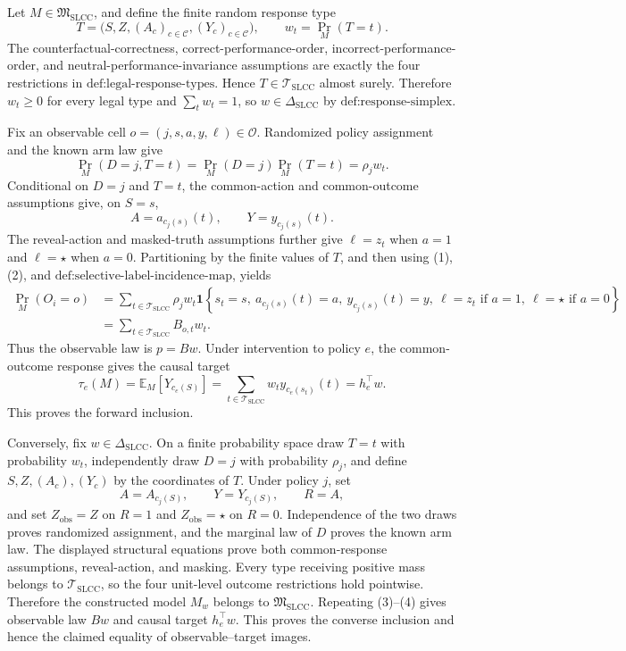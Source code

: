 Let \(M\in\mathfrak M_{\mathrm{SLCC}}\), and define the finite random response type
\[
T=\bigl(S,Z,(A_c)_{c\in\mathcal C},(Y_c)_{c\in\mathcal C}\bigr),
\qquad
w_t=\Pr_M(T=t).
\]
The counterfactual-correctness, correct-performance-order, incorrect-performance-order, and neutral-performance-invariance assumptions are exactly the four restrictions in \(\text{def:legal-response-types}\).  Hence \(T\in\mathcal T_{\mathrm{SLCC}}\) almost surely.  Therefore \(w_t\geq0\) for every legal type and \(\sum_t w_t=1\), so \(w\in\Delta_{\mathrm{SLCC}}\) by \(\text{def:response-simplex}\).

Fix an observable cell \(o=(j,s,a,y,\ell)\in\mathcal O\).  Randomized policy assignment and the known arm law give
\[
\Pr_M(D=j,T=t)=\Pr_M(D=j)\Pr_M(T=t)=\rho_jw_t.
\tag{1}
\]
Conditional on \(D=j\) and \(T=t\), the common-action and common-outcome assumptions give, on \(S=s\),
\[
A=a_{c_j(s)}(t),
\qquad
Y=y_{c_j(s)}(t).
\tag{2}
\]
The reveal-action and masked-truth assumptions further give \(\ell=z_t\) when \(a=1\) and \(\ell=\star\) when \(a=0\).  Partitioning by the finite values of \(T\), and then using (1), (2), and \(\text{def:selective-label-incidence-map}\), yields
\[
\begin{aligned}
\Pr_M(O_i=o)
&=\sum_{t\in\mathcal T_{\mathrm{SLCC}}}
 \rho_jw_t\mathbf 1\!\left\{s_t=s,\ a_{c_j(s)}(t)=a,\ y_{c_j(s)}(t)=y,
 \ \ell=z_t\text{ if }a=1,\ \ell=\star\text{ if }a=0\right\}\\
&=\sum_{t\in\mathcal T_{\mathrm{SLCC}}}B_{o,t}w_t.
\end{aligned}
\tag{3}
\]
Thus the observable law is \(p=Bw\).  Under intervention to policy \(e\), the common-outcome response gives the causal target
\[
\tau_e(M)=\mathbb E_M[Y_{c_e(S)}]
=\sum_{t\in\mathcal T_{\mathrm{SLCC}}}w_t y_{c_e(s_t)}(t)
=h_e^{\top}w.
\tag{4}
\]
This proves the forward inclusion.

Conversely, fix \(w\in\Delta_{\mathrm{SLCC}}\).  On a finite probability space draw \(T=t\) with probability \(w_t\), independently draw \(D=j\) with probability \(\rho_j\), and define \(S,Z,(A_c),(Y_c)\) by the coordinates of \(T\).  Under policy \(j\), set
\[
A=A_{c_j(S)},
\qquad
Y=Y_{c_j(S)},
\qquad
R=A,
\]
and set \(Z_{\mathrm{obs}}=Z\) on \(R=1\) and \(Z_{\mathrm{obs}}=\star\) on \(R=0\).  Independence of the two draws proves randomized assignment, and the marginal law of \(D\) proves the known arm law.  The displayed structural equations prove both common-response assumptions, reveal-action, and masking.  Every type receiving positive mass belongs to \(\mathcal T_{\mathrm{SLCC}}\), so the four unit-level outcome restrictions hold pointwise.  Therefore the constructed model \(M_w\) belongs to \(\mathfrak M_{\mathrm{SLCC}}\).  Repeating (3)--(4) gives observable law \(Bw\) and causal target \(h_e^{\top}w\).  This proves the converse inclusion and hence the claimed equality of observable--target images.